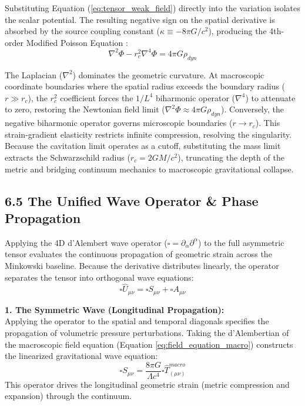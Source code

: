 Substituting Equation (\ref{eq:tensor_weak_field}) directly into the variation isolates the scalar potential. The resulting negative sign on the spatial derivative is absorbed by the source coupling constant ($\kappa \equiv -8\pi G / c^2$), producing the 4th-order Modified Poisson Equation \cite{Podolsky1942, Stelle1977}: 
\begin{equation}
    \nabla^2 \Phi - r_c^2 \nabla^4 \Phi = 4\pi G \rho_{dyn} \label{eq:4th_order_poisson}
\end{equation}

The Laplacian ($\nabla^2$) dominates the geometric curvature. At macroscopic coordinate boundaries where the spatial radius exceeds the boundary radius ($r \gg r_c$), the $r_c^2$ coefficient forces the $1/L^4$ biharmonic operator ($\nabla^4$) to attenuate to zero, restoring the Newtonian field limit ($\nabla^2 \Phi \approx 4\pi G \rho_{dyn}$). Conversely, the negative biharmonic operator governs microscopic boundaries ($r \to r_c$). This strain-gradient elasticity restricts infinite compression, resolving the singularity. Because the cavitation limit operates as a cutoff, substituting the mass limit extracts the Schwarzschild radius ($r_c = 2GM/c^2$), truncating the depth of the metric and bridging continuum mechanics to macroscopic gravitational collapse.


\subsection*{6.5 The Unified Wave Operator \& Phase Propagation}
Applying the 4D d'Alembert wave operator ($\square = \partial_\alpha \partial^\alpha$) to the full asymmetric tensor evaluates the continuous propagation of geometric strain across the Minkowski baseline. Because the derivative distributes linearly, the operator separates the tensor into orthogonal wave equations: 
\begin{equation}
    \square \hat{U}_{\mu\nu} = \square S_{\mu\nu} + \square A_{\mu\nu}
\end{equation}

\textbf{1. The Symmetric Wave (Longitudinal Propagation):} \\
Applying the operator to the spatial and temporal diagonals specifies the propagation of volumetric pressure perturbations. Taking the d'Alembertian of the macroscopic field equation (Equation \ref{eq:field_equation_macro}) constructs the linearized gravitational wave equation: 
\begin{equation}
    \square S_{\mu\nu} = \frac{8\pi G}{\Lambda c^4} \square \hat{T}^{macro}_{(\mu\nu)} 
\end{equation}
This operator drives the longitudinal geometric strain (metric compression and expansion) through the continuum.

